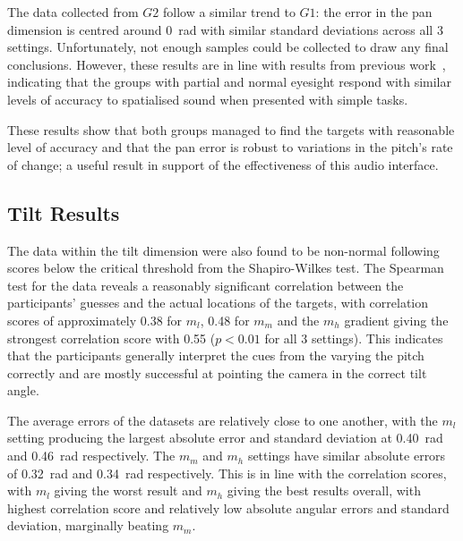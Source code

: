 \documentclass{llncs}
\begin{document}
The data collected from $G2$ follow a similar trend to $G1$: the error in the pan dimension is centred around \SI{0}{\radian} with similar standard deviations across all 3 settings.
Unfortunately, not enough samples could be collected to draw any final conclusions.
However, these results are in line with results from previous work~\cite{zwiers2001spatial}, indicating that the groups with partial and normal eyesight respond with similar levels of accuracy to spatialised sound when presented with simple tasks. 

These results show that both groups managed to find the targets with reasonable level of accuracy and that the pan error is robust to variations in the pitch's rate of change; a useful result in support of the effectiveness of this audio interface.

\subsection{Tilt Results}\label{sec:tilt-results}

The data within the tilt dimension were also found to be non-normal following scores below the critical threshold from the Shapiro-Wilkes test.
The Spearman test for the data reveals a reasonably significant correlation between the participants' guesses and the actual locations of the targets, with correlation scores of approximately 0.38 for $m_l$, 0.48 for $m_m$ and the $m_h$ gradient giving the strongest correlation score with 0.55 ($p < 0.01$ for all 3 settings).
This indicates that the participants generally interpret the cues from the varying the pitch correctly and are mostly successful at pointing the camera in the correct tilt angle.

The average errors of the datasets are relatively close to one another, with the $m_l$ setting producing the largest absolute error and standard deviation at \SI{0.40}{\radian} and \SI{0.46}{\radian} respectively.
The $m_m$ and $m_h$ settings have similar absolute errors of \SI{0.32}{\radian} and \SI{0.34}{\radian} respectively.
This is in line with the correlation scores, with $m_l$ giving the worst result and $m_h$ giving the best results overall, with highest correlation score and relatively low absolute angular errors and standard deviation, marginally beating $m_m$. 
\end{document}
